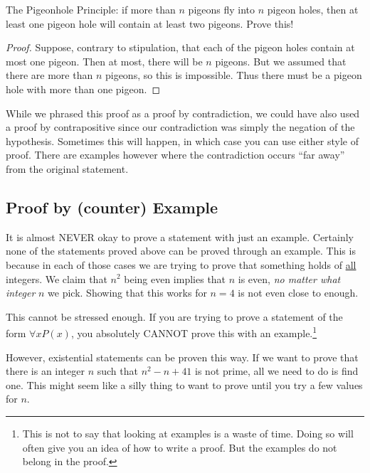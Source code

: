 \documentclass[12pt]{article}
\begin{document}
\begin{example}
The Pigeonhole Principle: if more than $n$ pigeons fly into $n$ pigeon holes, then at least one pigeon hole will contain at least two pigeons.  Prove this!

\begin{proof}
Suppose, contrary to stipulation, that each of the pigeon holes contain at most one pigeon.  Then at most, there will be $n$ pigeons.  But we assumed that there are more than $n$ pigeons, so this is impossible.  Thus there must be a pigeon hole with more than one pigeon.
\end{proof}

While we phrased this proof as a proof by contradiction, we could have also used a proof by contrapositive since our contradiction was simply the negation of the hypothesis.  Sometimes this will happen, in which case you can use either style of proof.  There are examples however where the contradiction occurs ``far away'' from the original statement.
\end{example}





\subsection*{Proof by (counter) Example}

It is almost NEVER okay to prove a statement with just an example.  Certainly none of the statements proved above can be proved through an example.  This is because in each of those cases we are trying to prove that something holds of \underline{all} integers.  We claim that $n^2$ being even implies that $n$ is even, {\em no matter what integer} $n$ we pick.  Showing that this works for $n = 4$ is not even close to enough.

This cannot be stressed enough.  If you are trying to prove a statement of the form $\forall x P(x)$, you absolutely CANNOT prove this with an example.\footnote{This is not to say that looking at examples is a waste of time.  Doing so will often give you an idea of how to write a proof.  But the examples do not belong in the proof.}

However, existential statements can be proven this way.  If we want to prove that there is an integer $n$ such that $n^2-n+41$ is not prime, all we need to do is find one.  This might seem like a silly thing to want to prove until you try a few values for $n$.
\end{document}
